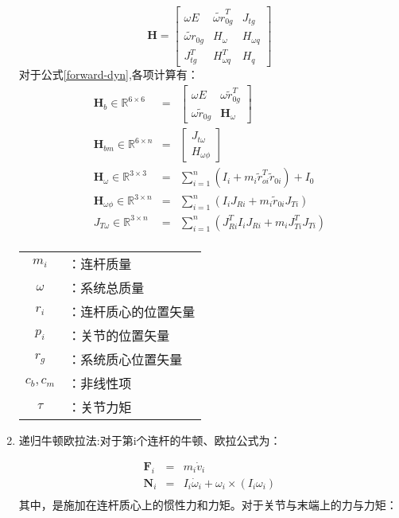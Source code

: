 \documentclass[UTF8]{ctexart}
\begin{document}
\begin{enumerate}[itemindent=0.3em]
	
	\begin{equation*}
	\boldsymbol{H}=\left[\begin{matrix}
	\omega E & \tilde{\omega r}_{0g}^T& J_{tg}\\
	\tilde{\omega r}_{0g} & H_\omega & H_{\omega q}\\
	J_{tg}^T &  H_{\omega q}^T& H_q
	\end{matrix}\right]
	\end{equation*}
	对于公式\ref{forward-dyn},各项计算有：
	\begin{eqnarray*}
		\boldsymbol{H}_b\in\mathbb{R}^{6 \times 6} &=& \left[\begin{matrix}
			\omega E & \omega \tilde{r}_{0g}^T\\
			\omega \tilde{r}_{0g} & \boldsymbol{H}_\omega
		\end{matrix}\right]\\
		\boldsymbol{H}_{bm} \in \mathbb{R}^{6 \times n} &=& \left[\begin{matrix}
			J_{t\omega}\\
			H_{\omega \phi}
		\end{matrix}\right]\\
		\boldsymbol{H}_\omega \in \mathbb{R}^{3 \times 3}&=& \sum_{i=1}^{n}(I_i+m_i\tilde{r}_{oi}^T\tilde{r}_{0i})+I_0\\
		\boldsymbol{H}_{\omega \phi} \in \mathbb{R}^{3 \times n} &=& \sum_{i=1}^{n}(I_iJ_{Ri}+m_i\tilde{r}_{0i}J_{Ti})\\
		J_{T\omega} \in \mathbb{R}^{3\times n}&=& \sum_{i=1}^{n}(J_{Ri}^TI_iJ_{Ri}+m_iJ_{Ti}^TJ_{Ti})\\
	\end{eqnarray*}
	\begin{table}[h]
	\centering
	\begin{tabular}{cl}
		$m_i$& ：连杆质量\\
		$\omega$&：系统总质量\\
		$r_i$&：连杆质心的位置矢量\\
		$p_i$ &：关节的位置矢量\\
		$r_g$&：系统质心位置矢量\\
		$c_b,c_m$&：非线性项\\
		$\tau$&：关节力矩
	\end{tabular}
\end{table}
\item 递归牛顿欧拉法:对于第i个连杆的牛顿、欧拉公式为：

\begin{eqnarray*}
	\boldsymbol{F}_i &=& m_i\dot{v}_i\\
	\boldsymbol{N}_i &=& I_i\dot{\omega}_i+\omega_i\times(I_i\omega_i)\\
\end{eqnarray*}
其中，是施加在连杆质心上的惯性力和力矩。对于关节与末端上的力与力矩：

\end{enumerate}
\end{document}

